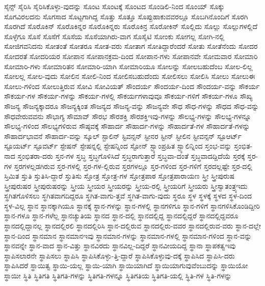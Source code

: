 {ಸೈನ್ಸ್
ಸೈರಿಸಿ
ಸೈರಿಸಿಕೊಳ್ಳು-ವುದನ್ನು
ಸೊಂಟ
ಸೊಂಟಕ್ಕೆ
ಸೊಂಟದ
ಸೊಂಡಿಲಿ-ನಿಂದ
ಸೊಂಯ್
ಸೊಕ್ಕು
ಸೊಗವಿರಲದನು
ಸೊಗಸಾದ
ಸೊಟ್ಟಗಾಗಿದ್ದ
ಸೊತ್ತು
ಸೊತ್ತೂ
ಸೊಪ್ಪುಹಾಕುವವರಲ್ಲೂ
ಸೊಬಗಿನೊಂದಿಗೆ
ಸೊರಗಿ
ಸೊರಗಿದೆ
ಸೊರೊಕಿನ್
ಸೊರೊಕಿನ್ನರ
ಸೊರೊಕಿನ್ನರು
ಸೊರೊಕಿನ್ರ
ಸೊರೋಕಿನ್
ಸೊಲ್ಲಿದು
ಸೊಲ್ಲು
ಸೊಲ್ಲುಗಳಲ್ಲಿದೆ
ಸೊಳ್ಳೆಗೂ
ಸೊಸೆ
ಸೊಸೆಗೆ
ಸೊಸೆಯ
ಸೊಸೆಯಾಗಿರು-ವಾಗ
ಸೊಸೈಟಿ
ಸೋಂಕು
ಸೋಗಲ್ಲ
ಸೋಗಿ-ನಲ್ಲಿ
ಸೋಜಿಗವನಿದನು
ಸೋತಂತೆ
ಸೋತರೂ
ಸೋತ-ವರು
ಸೋತಾಗ
ಸೋತಿದ್ದಾರೆಂದರೆ
ಸೋತು
ಸೋತೆನೆಂದು
ಸೋದರ
ಸೋದರತೆ
ಸೋದರಿಯರ
ಸೋಪಾನ
ಸೋಪಾನಕ್ರಮ-ದಿಂದ
ಸೋಪಾನ-ಗಳು
ಸೋಪಾನವೇ
ಸೋಮವಾರ
ಸೋಮಾರಿ
ಸೋಮಾರಿ-ಗಳು
ಸೋಮಾರಿತನ
ಸೋಮಾರಿ-ಯಾಗಿ
ಸೋಮಾರಿಯೂ
ಸೋಲನ್ನು
ಸೋಲಬಹುದೆಂಬ
ಸೋಲ-ಲಿಲ್ಲ
ಸೋಲಲ್ಲ
ಸೋಲ-ವುದು
ಸೋಲಿನ
ಸೋಲಿ-ನಿಂದ
ಸೋಲಿಸಬಹುದೆಂದು
ಸೋಲಿಸಲು
ಸೋಲಿಸಿ
ಸೋಲು
ಸೋಲುಈ
ಸೋಲು-ಗಳಿಂದ
ಸೋಲುತ್ತಿರುವ
ಸೋವಿ
ಸೋವಿಯತ್
ಸೌಂದರ್ಯ
ಸೌಂದರ್ಯ-ದಿಂದ
ಸೌಂದರ್ಯ-ವನ್ನು
ಸೌಕರ್ಯ
ಸೌಕರ್ಯ-ಗಳ
ಸೌಕರ್ಯ-ಗಳನ್ನು
ಸೌಕರ್ಯ-ಗಳಲ್ಲಿ
ಸೌಕರ್ಯಗಳಾವುವೂ
ಸೌಕರ್ಯ-ಗಳಿಗೆ
ಸೌಕರ್ಯ-ಗಳೂ
ಸೌಖ್ಯ
ಸೌಜನ್ಯ
ಸೌಜನ್ಯಕ್ಕಾದರೂ
ಸೌಜನ್ಯಕ್ಕಿಂತ
ಸೌಜನ್ಯದ
ಸೌಜನ್ಯ-ವನ್ನು
ಸೌಜನ್ಯವೇ
ಸೌಧ
ಸೌಧ-ಗಳನ್ನು
ಸೌಧದ
ಸೌಧ-ವನ್ನು
ಸೌಧವೇರುವವನು
ಸೌಭಾಗ್ಯ
ಸೌಮಾವ್
ಸೌರಭ
ಸೌರಶಕ್ತಿ
ಸೌರಶಕ್ತಿಇವು-ಗಳನ್ನು
ಸೌಲಭ್ಯ-ಗಳನ್ನು
ಸೌಲಭ್ಯ-ಗಳನ್ನೂ
ಸೌಲಭ್ಯ-ಗಳಿಂದ
ಸೌಲಭ್ಯಗಳಿರುವ
ಸೌಷ್ಠವಕ್ಕೆ
ಸೌಹಾರ್ದ
ಸೌಹಾರ್ದ-ಗಳನ್ನು
ಸೌಹಾರ್ದತೆ-ಗಳ
ಸೌಹಾರ್ದತೆ-ಗಳನ್ನು
ಸೌಹಾರ್ದಭಾವನೆ
ಸೌಹಾರ್ದ-ವನ್ನು
ಸ್ಕೂಲ್
ಸ್ಟಾಲಿನ್
ಸ್ಟಿವನ್ಸನ್
ಸ್ಟೀನರ
ಸ್ಟೀನ್
ಸ್ಟೀಲಿನ
ಸ್ಟೀವನ್ಸನ್
ಸ್ಟೂಆರ್ಟ್
ಸ್ಟೂಯರ್ಟ್
ಸ್ಟೂವರ್ಟ್
ಸ್ಟೇಷನ್
ಸ್ಟೇಷನ್ನಲ್ಲಿ
ಸ್ಟೇಷನ್ನಿಂದ
ಸ್ಟೋನ್
ಸ್ಟ್ಯಾಂಪ್ರಹಿತ
ಸ್ಟ್ಯಾಲಿನ್ನಿಂದ
ಸ್ತಂಭ-ವನ್ನು
ಸ್ತಂಭಿತ-ನಾದ
ಸ್ತಂಭಿತರಾ-ದರು
ಸ್ತನ-ಗಳ
ಸ್ತಬ್ಧ
ಸ್ತಬ್ಧಗೊಳಿಸಿದೆ
ಸ್ತಬ್ಧರಾಗುತ್ತಾರೆ
ಸ್ತಬ್ಧವಾ-ದಂತೆ
ಸ್ತಬ್ಧವಾದದ್ದಿದೆಯೆ
ಸ್ತರಕ್ಕೆ
ಸ್ತರ-ಗಳ
ಸ್ತರಗಳಲ್ಲಡಗಿರುವ
ಸ್ತರ-ಗಳಲ್ಲಿ
ಸ್ತರ-ಗಳ-ಲ್ಲಿರುವ
ಸ್ತರಗಳಲ್ಲೂ
ಸ್ತರ-ಗಳಿಂದ
ಸ್ತರ-ಗಳಿಗೆ
ಸ್ತರದಲ್ಲಷ್ಟೇ
ಸ್ತರ-ದಲ್ಲಿ
ಸ್ತಿಮಿತ
ಸ್ತುತಿ
ಸ್ತುತಿಸಿ-ದ್ದಾರೆ
ಸ್ತುತಿಸು
ಸ್ತೋತ್ರ
ಸ್ತೋತ್ರ-ಗಳ
ಸ್ತೋತ್ರಪಾಠ
ಸ್ತೋತ್ರಪಾರಾಯಣ
ಸ್ತ್ರೀ
ಸ್ತ್ರೀಪುರುಷ
ಸ್ತ್ರೀಪುರುಷರ
ಸ್ತ್ರೀಪುರುಷರನ್ನು
ಸ್ತ್ರೀಯ
ಸ್ತ್ರೀಯರ
ಸ್ತ್ರೀಯರನ್ನು
ಸ್ತ್ರೀಯ-ರಲ್ಲಿ
ಸ್ತ್ರೀಯರಿಗೆ
ಸ್ತ್ರೀಯರು
ಸ್ತ್ರೀಸ್ವಾತಂತ್ರ್ಯಇದು
ಸ್ಥಗಿತಗೊಳಿಸಲು
ಸ್ಥಗಿತವಾಗದಿದ್ದರೂ
ಸ್ಥಗಿತ-ವಾಗು-ತ್ತವೆ
ಸ್ಥಗಿತ-ವಾಗು-ವುದು
ಸ್ಥರೂ
ಸ್ಥಳ
ಸ್ಥಳಕ್ಕೆ
ಸ್ಥಳದ
ಸ್ಥಳ-ದಿಂದ
ಸ್ಥಳ-ವಿಲ್ಲ
ಸ್ಥಾನ
ಸ್ಥಾನಕ್ಕಾಗಿಯೂ
ಸ್ಥಾನಕ್ಕೆ
ಸ್ಥಾನ-ಗಳನ್ನು
ಸ್ಥಾನ-ಗಳಲ್ಲಿ
ಸ್ಥಾನಗಳಿಗೂ
ಸ್ಥಾನ-ಗಳಿಗೆ
ಸ್ಥಾನಗಳಿಸಿಕೊಂಡಿದ್ದೀರಿ
ಸ್ಥಾನ-ಗಳೂ
ಸ್ಥಾನ-ಗಳೆಲ್ಲ
ಸ್ಥಾನಚ್ಯುತಿಯ
ಸ್ಥಾನದ
ಸ್ಥಾನ-ದಲ್ಲಿ
ಸ್ಥಾನದಲ್ಲಿದ್ದ
ಸ್ಥಾನದಲ್ಲಿದ್ದರೆ
ಸ್ಥಾನದಲ್ಲಿದ್ದವರೂ
ಸ್ಥಾನದಲ್ಲಿದ್ದಾನಲ್ಲ
ಸ್ಥಾನದಲ್ಲಿರಲಿ
ಸ್ಥಾನದಲ್ಲಿರಿಸಿ
ಸ್ಥಾನ-ದಲ್ಲಿರುವ
ಸ್ಥಾನದಲ್ಲಿರು-ವವರ
ಸ್ಥಾನದಲ್ಲಿರುವ-ವರು
ಸ್ಥಾನ-ದಲ್ಲೇ
ಸ್ಥಾನ-ದಿಂದ
ಸ್ಥಾನಮಾನ
ಸ್ಥಾನಮಾನಇವು
ಸ್ಥಾನಮಾನ-ಗಳನ್ನು
ಸ್ಥಾನಮಾನ-ಗಳಲ್ಲಿ
ಸ್ಥಾನಮಾನ-ಗಳಿಂದ
ಸ್ಥಾನ-ವನ್ನು
ಸ್ಥಾನವನ್ನೇ
ಸ್ಥಾನ-ವಾದ
ಸ್ಥಾನ-ವಿತ್ತು
ಸ್ಥಾನವಿರದು
ಸ್ಥಾನವಿಲ್ಲ-ದಿದ್ದರೆ
ಸ್ಥಾನವೀಯದಿದ್ದ
ಸ್ಥಾನಾ
ಸ್ಥಾಪಕತ್ವಇವು
ಸ್ಥಾಪಿಸಲಾರನೇ
ಸ್ಥಾಪಿಸಲು
ಸ್ಥಾಪಿಸಿ
ಸ್ಥಾಪಿಸಿಕೊಳ್ಳು-ತ್ತಿ-ದ್ದಾರೆ
ಸ್ಥಾಪಿಸಿಕೊಳ್ಳುವು-ದಕ್ಕೆ
ಸ್ಥಾಪಿಸಿದ
ಸ್ಥಾಪಿಸಿ-ದರು
ಸ್ಥಾಪಿಸಿದರೆ
ಸ್ಥಾಯಿತ್ವ
ಸ್ಥಾಯಿ-ಯಲ್ಲ
ಸ್ಥಾಯಿ-ಯಾಗಿ
ಸ್ಥಾಯಿಯಾಗಿದೆ
ಸ್ಥಾಯಿಯಾಗುವುವೆಂಬುದನ್ನು
ಸ್ಥಾಯಿಯೋ
ಸ್ಥಾಯೀ
ಸ್ಥಿತಿ
ಸ್ಥಿತಿಗತಿ
ಸ್ಥಿತಿಗತಿ-ಗಳನ್ನು
ಸ್ಥಿತಿಗತಿ-ಗಳನ್ನೂ
ಸ್ಥಿತಿಗತಿಯ
ಸ್ಥಿತಿಗತಿ-ಯಲ್ಲಿ
ಸ್ಥಿತಿ-ಗಳ
ಸ್ಥಿತಿ-ಗಳನ್ನು
}
